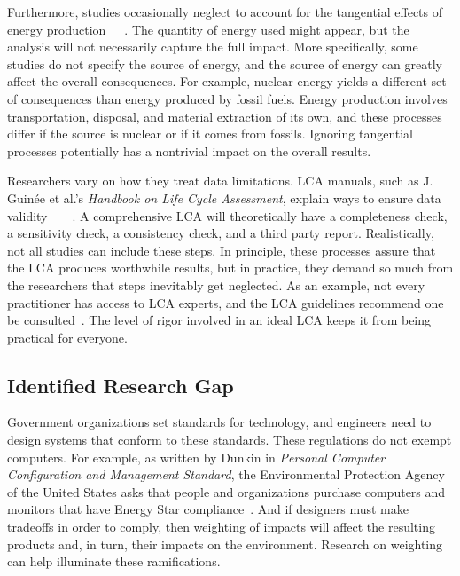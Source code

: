 \documentclass[final,journal,10pt,letterpaper,oneside,twocolumn,compsoc]%
{IEEEtran}
\begin{document}
Furthermore, studies occasionally neglect to account for the tangential effects
of energy production~\cite{maga}~\cite{client}~\cite{desktop}. The quantity of energy used might appear, but
the analysis will not necessarily capture the full impact.
More specifically, some studies do not specify the source of energy, and the
source of energy can
greatly affect the overall consequences. For example, nuclear energy yields a
different set
of consequences than energy produced by fossil fuels. Energy production involves
transportation,
disposal, and material extraction of its own, and these processes differ if the
source is nuclear or if it comes from fossils. Ignoring tangential processes
potentially has a nontrivial impact on the overall results.

Researchers vary on how they treat data limitations. LCA manuals, such as J.
Guin\'{e}e et al.'s \textit{Handbook on Life Cycle Assessment}, explain
ways to ensure data validity~\cite{lca}~\cite{textbook}~\cite{14040}~\cite{14044}. A comprehensive LCA will theoretically have a
completeness check, a sensitivity check, a consistency check, and a third party
report. Realistically, not all studies can include these steps. In
principle, these processes assure that the LCA produces worthwhile
results, but in practice, they demand so much from the researchers that
steps inevitably get neglected. As an example, not every practitioner has access
to LCA experts, and the LCA guidelines recommend one be
consulted~\cite{14044}. The level of rigor involved in an ideal LCA
keeps it from being practical for everyone.

\subsection{Identified Research Gap}
Government organizations set standards for technology, and
engineers need to design systems that conform to these standards. These
regulations do not exempt computers. For example, as written by Dunkin in
\textit{Personal Computer Configuration and Management Standard}, the
Environmental Protection
Agency of the United States asks that people and organizations purchase
computers and monitors that have Energy Star
compliance~\cite{epa}. And if designers must make
tradeoffs in order to comply, then weighting of impacts will affect
the resulting products and, in turn, their impacts on the environment.
Research on weighting can help illuminate these ramifications.
\end{document}
